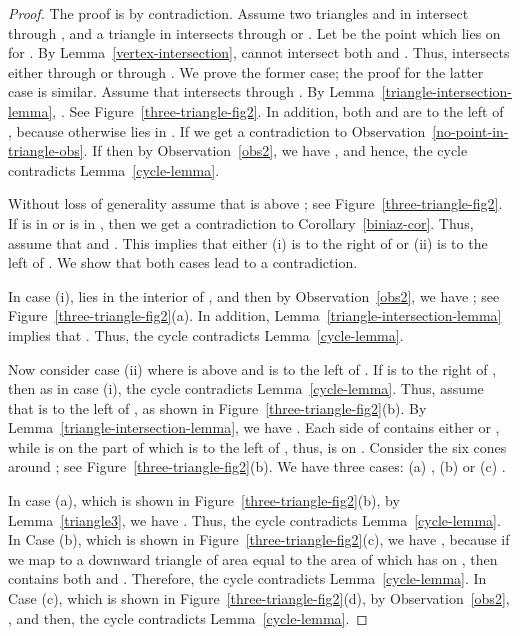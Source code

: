 \documentclass[11pt,a4paper]{article}
\begin{document}
\begin{proof}
The proof is by contradiction. Assume two triangles  and  in  intersect  through , and a triangle  in  intersects  through  or . Let  be the point which lies on  for . By Lemma~\ref{vertex-intersection},  cannot intersect both  and . Thus,  intersects  either through  or through . We prove the former case; the proof for the latter case is similar. Assume that  intersects  through . By Lemma~\ref{triangle-intersection-lemma}, . See Figure~\ref{three-triangle-fig2}. In addition, both  and  are to the left of , because otherwise  lies in . If  we get a contradiction to Observation~\ref{no-point-in-triangle-obs}. If  then by Observation~\ref{obs2}, we have , and hence, the cycle  contradicts Lemma~\ref{cycle-lemma}.

Without loss of generality assume that  is above ; see Figure~\ref{three-triangle-fig2}. If  is in  or  is in , then we get a contradiction to Corollary~\ref{biniaz-cor}. Thus, assume that  and . This implies that either (i)  is to the right of  or (ii)  is to the left of . We show that both cases lead to a contradiction.

In case (i),  lies in the interior of , and then by Observation~\ref{obs2}, we have ; see Figure~\ref{three-triangle-fig2}(a). In addition, Lemma~\ref{triangle-intersection-lemma} implies that . Thus, the cycle  contradicts Lemma~\ref{cycle-lemma}.

Now consider case (ii) where  is above  and  is to the left of . If  is to the right of , then as in case (i), the cycle  contradicts Lemma~\ref{cycle-lemma}. Thus, assume that  is to the left of , as shown in Figure~\ref{three-triangle-fig2}(b). By Lemma~\ref{triangle-intersection-lemma}, we have . Each side of  contains either  or , while  is on the part of  which is to the left of , thus,  is on . Consider the six cones around ; see Figure~\ref{three-triangle-fig2}(b). We have three cases: (a) , (b)  or (c) . 

In case (a), which is shown in Figure~\ref{three-triangle-fig2}(b), by Lemma~\ref{triangle3}, we have . Thus, the cycle  contradicts Lemma~\ref{cycle-lemma}. In Case (b), which is shown in Figure~\ref{three-triangle-fig2}(c), we have , because if we map  to a downward triangle \textemdash of area equal to the area of \textemdash which has  on , then  contains both  and . Therefore, the cycle  contradicts Lemma~\ref{cycle-lemma}. In Case (c), which is shown in Figure~\ref{three-triangle-fig2}(d), by Observation~\ref{obs2}, , and then, the cycle  contradicts Lemma~\ref{cycle-lemma}.
\end{proof}
\end{document}
